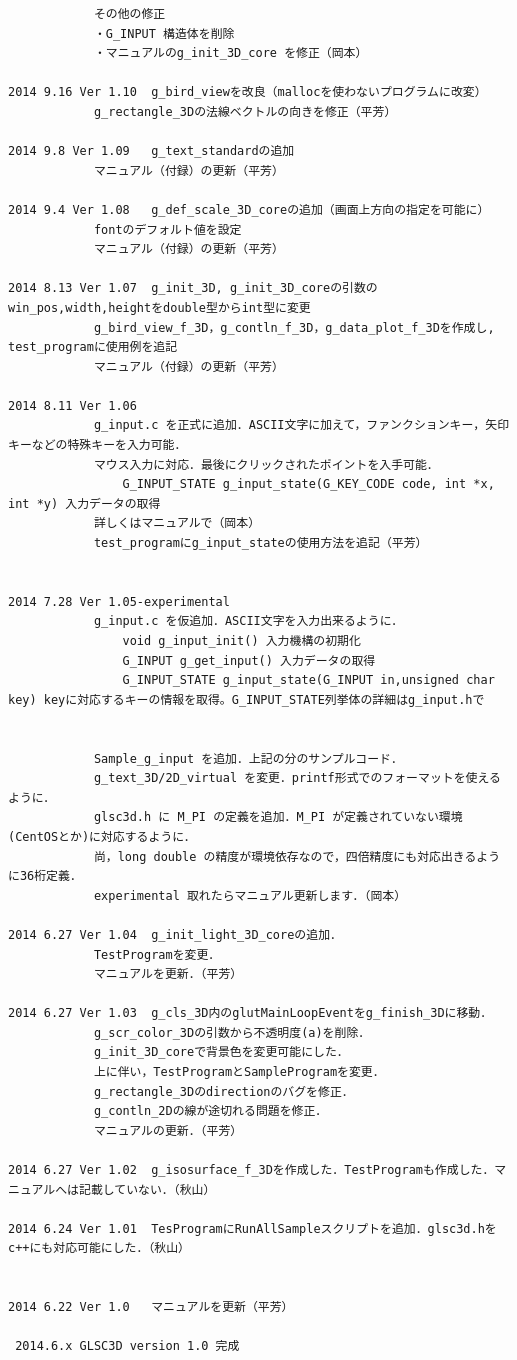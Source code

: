 \documentclass[platex,a4paper,12pt]{jsarticle}%
\begin{document}
\begin{verbatim}
			その他の修正
			・G_INPUT 構造体を削除
			・マニュアルのg_init_3D_core を修正（岡本）

2014 9.16 Ver 1.10	g_bird_viewを改良（mallocを使わないプログラムに改変）
			g_rectangle_3Dの法線ベクトルの向きを修正（平芳）

2014 9.8 Ver 1.09	g_text_standardの追加
			マニュアル（付録）の更新（平芳）

2014 9.4 Ver 1.08	g_def_scale_3D_coreの追加（画面上方向の指定を可能に）
			fontのデフォルト値を設定
			マニュアル（付録）の更新（平芳）

2014 8.13 Ver 1.07	g_init_3D, g_init_3D_coreの引数のwin_pos,width,heightをdouble型からint型に変更
			g_bird_view_f_3D，g_contln_f_3D，g_data_plot_f_3Dを作成し, test_programに使用例を追記
			マニュアル（付録）の更新（平芳）

2014 8.11 Ver 1.06
			g_input.c を正式に追加．ASCII文字に加えて，ファンクションキー，矢印キーなどの特殊キーを入力可能．
			マウス入力に対応．最後にクリックされたポイントを入手可能．
				G_INPUT_STATE g_input_state(G_KEY_CODE code, int *x, int *y) 入力データの取得
			詳しくはマニュアルで（岡本）
			test_programにg_input_stateの使用方法を追記（平芳）


2014 7.28 Ver 1.05-experimental
			g_input.c を仮追加．ASCII文字を入力出来るように．
				void g_input_init() 入力機構の初期化
				G_INPUT g_get_input() 入力データの取得
				G_INPUT_STATE g_input_state(G_INPUT in,unsigned char key) keyに対応するキーの情報を取得。G_INPUT_STATE列挙体の詳細はg_input.hで


			Sample_g_input を追加．上記の分のサンプルコード．
			g_text_3D/2D_virtual を変更．printf形式でのフォーマットを使えるように．
			glsc3d.h に M_PI の定義を追加．M_PI が定義されていない環境(CentOSとか)に対応するように．
			尚，long double の精度が環境依存なので，四倍精度にも対応出きるように36桁定義．
			experimental 取れたらマニュアル更新します．（岡本）

2014 6.27 Ver 1.04	g_init_light_3D_coreの追加．
			TestProgramを変更．
			マニュアルを更新．（平芳）

2014 6.27 Ver 1.03	g_cls_3D内のglutMainLoopEventをg_finish_3Dに移動．
			g_scr_color_3Dの引数から不透明度(a)を削除．
			g_init_3D_coreで背景色を変更可能にした．
			上に伴い，TestProgramとSampleProgramを変更．
			g_rectangle_3Dのdirectionのバグを修正．
			g_contln_2Dの線が途切れる問題を修正．
			マニュアルの更新．（平芳）

2014 6.27 Ver 1.02 	g_isosurface_f_3Dを作成した．TestProgramも作成した．マニュアルへは記載していない．（秋山）

2014 6.24 Ver 1.01 	TesProgramにRunAllSampleスクリプトを追加．glsc3d.hをc++にも対応可能にした．（秋山）


2014 6.22 Ver 1.0 	マニュアルを更新（平芳）

 2014.6.x GLSC3D version 1.0 完成
\end{verbatim}
\newpage
\end{document}
